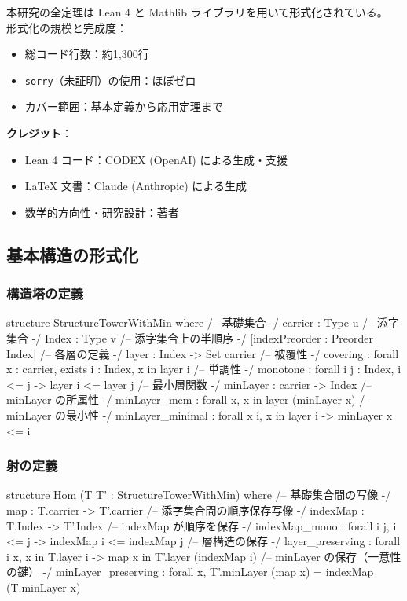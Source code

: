 \documentclass[11pt,a4paper]{article}
\theoremstyle{plain}
\theoremstyle{definition}
\begin{document}
本研究の全定理は Lean 4 と Mathlib ライブラリを用いて形式化されている。
形式化の規模と完成度：
\begin{itemize}
  \item 総コード行数：約1,300行
  \item \texttt{sorry}（未証明）の使用：ほぼゼロ
  \item カバー範囲：基本定義から応用定理まで
\end{itemize}

\textbf{クレジット}：
\begin{itemize}
  \item Lean 4 コード：CODEX (OpenAI) による生成・支援
  \item \LaTeX{} 文書：Claude (Anthropic) による生成
  \item 数学的方向性・研究設計：著者
\end{itemize}

\subsection{基本構造の形式化}

\subsubsection{構造塔の定義}

\begin{leancode}
structure StructureTowerWithMin where
  /-- 基礎集合 -/
  carrier : Type u
  /-- 添字集合 -/
  Index : Type v
  /-- 添字集合上の半順序 -/
  [indexPreorder : Preorder Index]
  /-- 各層の定義 -/
  layer : Index -> Set carrier
  /-- 被覆性 -/
  covering : forall x : carrier, exists i : Index, x in layer i
  /-- 単調性 -/
  monotone : forall {i j : Index}, i <= j -> layer i <= layer j
  /-- 最小層関数 -/
  minLayer : carrier -> Index
  /-- minLayer の所属性 -/
  minLayer_mem : forall x, x in layer (minLayer x)
  /-- minLayer の最小性 -/
  minLayer_minimal : forall x i, x in layer i -> minLayer x <= i
\end{leancode}

\subsubsection{射の定義}

\begin{leancode}
structure Hom (T T' : StructureTowerWithMin) where
  /-- 基礎集合間の写像 -/
  map : T.carrier -> T'.carrier
  /-- 添字集合間の順序保存写像 -/
  indexMap : T.Index -> T'.Index
  /-- indexMap が順序を保存 -/
  indexMap_mono : forall {i j}, i <= j -> indexMap i <= indexMap j
  /-- 層構造の保存 -/
  layer_preserving : forall i x, x in T.layer i -> map x in T'.layer (indexMap i)
  /-- minLayer の保存（一意性の鍵） -/
  minLayer_preserving : forall x, T'.minLayer (map x) = indexMap (T.minLayer x)
\end{leancode}
\end{document}
